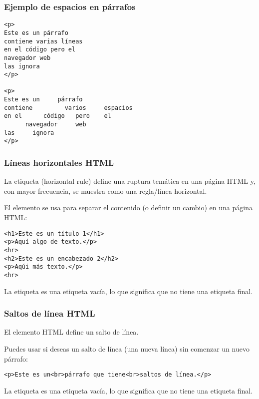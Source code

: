 \begin{frame}[fragile]
  \frametitle{Ejemplo de espacios en párrafos}
  \begin{lstlisting}
<p>
Este es un párrafo
contiene varias líneas
en el código pero el
navegador web
las ignora
</p>

<p>
Este es un     párrafo
contiene         varios     espacios
en el      código   pero    el
      navegador     web
las     ignora
</p>
  \end{lstlisting}
\end{frame}

\begin{frame}[fragile]
  \frametitle{Líneas horizontales HTML}

  La etiqueta  (horizontal rule) define una ruptura
  temática en una página HTML y, con mayor frecuencia, se muestra
  como una regla/línea horizontal.

  \vspace{\baselineskip}
  El elemento  se usa para separar el contenido (o definir
  un cambio) en una página HTML:

  \vspace{\baselineskip}
  \begin{lstlisting}
<h1>Este es un título 1</h1>
<p>Aquí algo de texto.</p>
<hr>
<h2>Este es un encabezado 2</h2>
<p>Aqúi más texto.</p>
<hr>
  \end{lstlisting}

  \vspace{\baselineskip}
  La etiqueta  es una etiqueta vacía, lo que significa
  que no tiene una etiqueta final.
\end{frame}

\begin{frame}[fragile]
  \frametitle{Saltos de línea HTML}

  El elemento HTML  define un salto de línea.

  \vspace{\baselineskip}
  Puedes usar  si deseas un salto de línea
  (una nueva línea) sin comenzar un nuevo párrafo:

  \vspace{\baselineskip}
  \begin{lstlisting}
<p>Este es un<br>párrafo que tiene<br>saltos de línea.</p>
  \end{lstlisting}

  \vspace{\baselineskip}
  La etiqueta  es una etiqueta vacía, lo que significa
  que no tiene una etiqueta final.
\end{frame}

